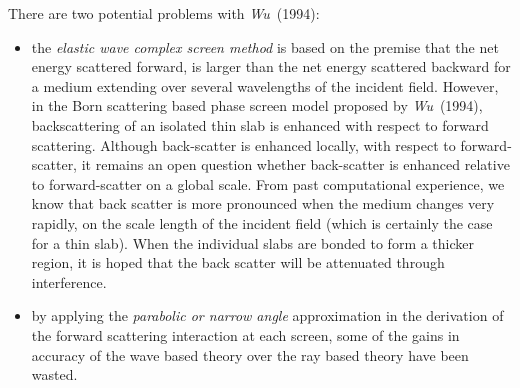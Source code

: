 There are two potential problems with {\em Wu\/}~(1994):
\begin{itemize}
\item  the {\em elastic wave 
complex screen method\/} is based on the premise that the net energy 
scattered forward, is larger than the net energy scattered backward for a 
medium extending over several wavelengths of the incident field. However,
in the Born scattering based phase screen model proposed by {\em Wu\/}~(1994),
backscattering of an isolated thin slab is enhanced with respect to 
forward scattering. Although back-scatter is enhanced locally, with 
respect to forward-scatter, it remains an open question whether  
back-scatter is enhanced relative to forward-scatter on a global scale. 
From past computational experience, we know that back scatter is more 
pronounced when the medium changes very rapidly, on the scale length of 
the incident field (which is certainly the case for a thin slab). When 
the individual slabs are bonded to form a thicker region, it is hoped 
that the back scatter will be attenuated through interference.
\item by applying the {\em parabolic or narrow angle\/} approximation in 
the derivation of the forward scattering interaction at each screen, some 
of the gains in accuracy of the wave based theory over the ray based 
theory have been wasted.
\end{itemize}


